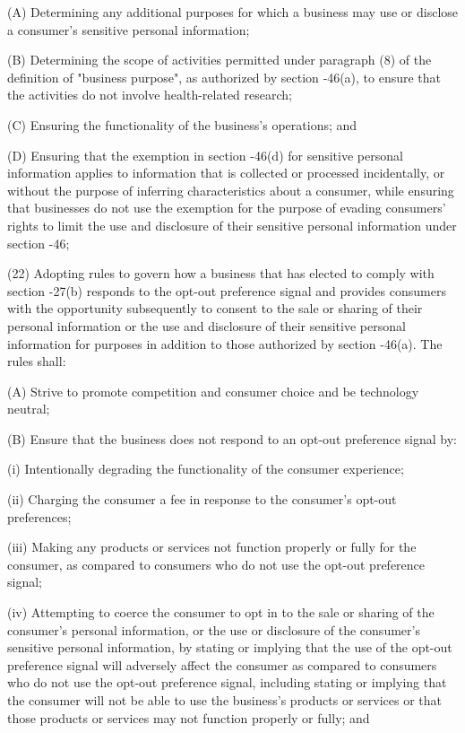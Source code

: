           (A)  Determining any additional purposes for which a business may use or disclose a consumer's sensitive personal information;

          (B)  Determining the scope of activities permitted under paragraph (8) of the definition of "business purpose", as authorized by section    ‑46(a), to ensure that the activities do not involve health-related research;

          (C)  Ensuring the functionality of the business's operations; and

          (D)  Ensuring that the exemption in section    -46(d) for sensitive personal information applies to information that is collected or processed incidentally, or without the purpose of inferring characteristics about a consumer, while ensuring that businesses do not use the exemption for the purpose of evading consumers' rights to limit the use and disclosure of their sensitive personal information under section    -46;

    (22)  Adopting rules to govern how a business that has elected to comply with section    -27(b) responds to the opt-out preference signal and provides consumers with the opportunity subsequently to consent to the sale or sharing of their personal information or the use and disclosure of their sensitive personal information for purposes in addition to those authorized by section    -46(a).  The rules shall:

          (A)  Strive to promote competition and consumer choice and be technology neutral;

          (B)  Ensure that the business does not respond to an opt-out preference signal by:

               (i)  Intentionally degrading the functionality of the consumer experience;

              (ii)  Charging the consumer a fee in response to the consumer's opt-out preferences;

             (iii)  Making any products or services not function properly or fully for the consumer, as compared to consumers who do not use the opt-out preference signal;

              (iv)  Attempting to coerce the consumer to opt in to the sale or sharing of the consumer's personal information, or the use or disclosure of the consumer's sensitive personal information, by stating or implying that the use of the opt-out preference signal will adversely affect the consumer as compared to consumers who do not use the opt-out preference signal, including stating or implying that the consumer will not be able to use the business's products or services or that those products or services may not function properly or fully; and

